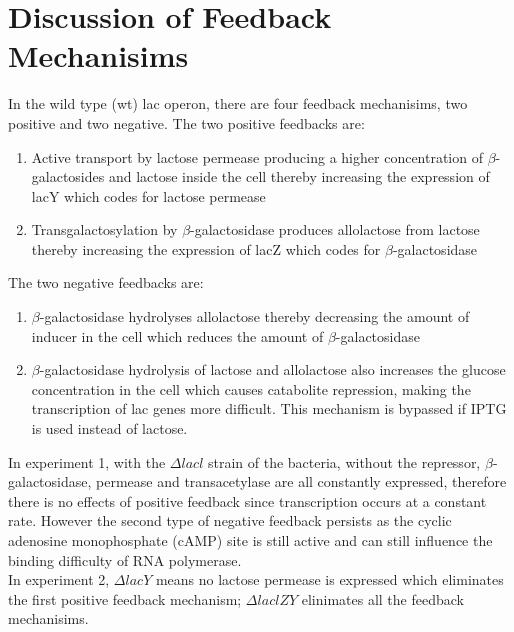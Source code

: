 \documentclass{article}
\begin{document}
\section{Discussion of Feedback Mechanisims}
In the wild type (wt) lac operon, there are four feedback mechanisims, two positive and two negative. The two positive feedbacks are:
\begin{enumerate}
  \item Active transport by lactose permease producing a higher concentration of $\beta$-galactosides and lactose inside the cell thereby increasing the expression of lacY which codes for lactose permease
  \item Transgalactosylation by $\beta$-galactosidase produces allolactose from lactose thereby increasing the expression of lacZ which codes for $\beta$-galactosidase
\end{enumerate}
The two negative feedbacks are:
\begin{enumerate}
  \item $\beta$-galactosidase hydrolyses allolactose thereby decreasing the amount of inducer in the cell which reduces the amount of $\beta$-galactosidase
  \item $\beta$-galactosidase hydrolysis of lactose and allolactose also increases the glucose concentration in the cell which causes catabolite repression, making the transcription of lac genes more difficult. This mechanism is bypassed if IPTG is used instead of lactose.
\end{enumerate}
In experiment 1, with the $\Delta lacl$ strain of the bacteria, without the repressor, $\beta$-galactosidase, permease and transacetylase are all constantly expressed, therefore there is no effects of positive feedback since transcription occurs at a constant rate. However the second type of negative feedback persists as the cyclic adenosine monophosphate (cAMP) site is still active and can still influence the binding difficulty of RNA polymerase.\\
In experiment 2, $\Delta lacY$ means no lactose permease is expressed which eliminates the first positive feedback mechanism; $\Delta laclZY$ elinimates all the feedback mechanisims.
\end{document}
